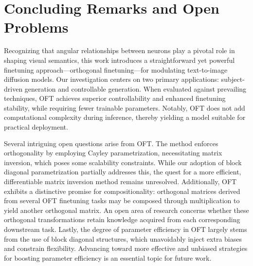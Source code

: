 \section{Concluding Remarks and Open Problems}

Recognizing that angular relationships between neurons play a pivotal role in shaping visual semantics, this work introduces a straightforward yet powerful finetuning approach—orthogonal finetuning—for modulating text-to-image diffusion models. Our investigation centers on two primary applications: subject-driven generation and controllable generation. When evaluated against prevailing techniques, OFT achieves superior controllability and enhanced finetuning stability, while requiring fewer trainable parameters. Notably, OFT does not add computational complexity during inference, thereby yielding a model suitable for practical deployment.

Several intriguing open questions arise from OFT. The method enforces orthogonality by employing Cayley parametrization, necessitating matrix inversion, which poses some scalability constraints. While our adoption of block diagonal parametrization partially addresses this, the quest for a more efficient, differentiable matrix inversion method remains unresolved. Additionally, OFT exhibits a distinctive promise for compositionality: orthogonal matrices derived from several OFT finetuning tasks may be composed through multiplication to yield another orthogonal matrix. An open area of research concerns whether these orthogonal transformations retain knowledge acquired from each corresponding downstream task. Lastly, the degree of parameter efficiency in OFT largely stems from the use of block diagonal structures, which unavoidably inject extra biases and constrain flexibility. Advancing toward more effective and unbiased strategies for boosting parameter efficiency is an essential topic for future work.

